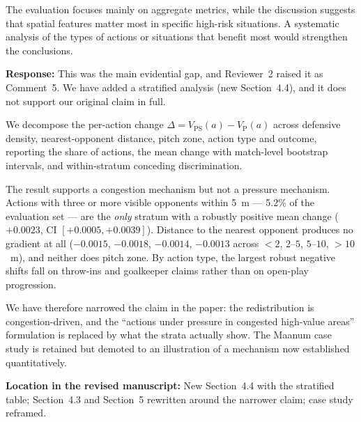 \documentclass[11pt,a4paper]{article}
\newcommand{\response}[2]{%
  \begin{responsebox}
  \textbf{Response:}
  #1
  \end{responsebox}
  \begin{locationbox}
  \textbf{Location in the revised manuscript:}
  #2
  \end{locationbox}
}
\begin{document}
\begin{reviewbox}
The evaluation focuses mainly on aggregate metrics, while the discussion suggests that spatial features matter most in specific high-risk situations. A systematic analysis of the types of actions or situations that benefit most would strengthen the conclusions.
\end{reviewbox}
\response{This was the main evidential gap, and Reviewer~2 raised it as Comment~5. We have added a stratified analysis (new Section~4.4), and it does not support our original claim in full.

We decompose the per-action change $\Delta = V_{\mathrm{PS}}(a) - V_{\mathrm{P}}(a)$ across defensive density, nearest-opponent distance, pitch zone, action type and outcome, reporting the share of actions, the mean change with match-level bootstrap intervals, and within-stratum conceding discrimination.

The result supports a congestion mechanism but not a pressure mechanism. Actions with three or more visible opponents within 5~m --- 5.2\% of the evaluation set --- are the \emph{only} stratum with a robustly positive mean change ($+0.0023$, CI $[+0.0005, +0.0039]$). Distance to the nearest opponent produces no gradient at all ($-0.0015$, $-0.0018$, $-0.0014$, $-0.0013$ across $<2$, $2$--$5$, $5$--$10$, $>10$~m), and neither does pitch zone. By action type, the largest robust negative shifts fall on throw-ins and goalkeeper claims rather than on open-play progression.

We have therefore narrowed the claim in the paper: the redistribution is congestion-driven, and the ``actions under pressure in congested high-value areas'' formulation is replaced by what the strata actually show. The Maanum case study is retained but demoted to an illustration of a mechanism now established quantitatively.}{New Section~4.4 with the stratified table; Section~4.3 and Section~5 rewritten around the narrower claim; case study reframed.}
\end{document}
